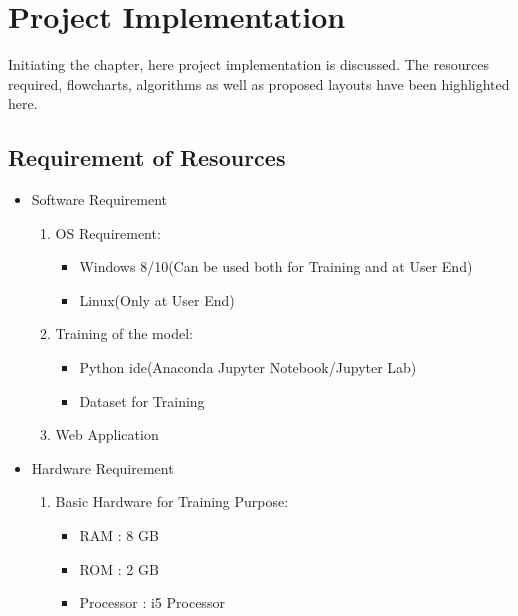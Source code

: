\chapter{Project Implementation}

Initiating the chapter, here project implementation is discussed. The resources required, flowcharts, algorithms as well as proposed layouts have been highlighted here.\\ 

\section{Requirement of Resources}
\begin{itemize}
    \item Software Requirement 
        \begin{enumerate}
            \item OS Requirement:
                \begin{itemize}
                    \item Windows 8/10(Can be used both for Training and at User End)
                    \item Linux(Only at User End)
                \end{itemize}
            \item Training of the model:
                \begin{itemize}
                    \item Python ide(Anaconda Jupyter Notebook/Jupyter Lab)
                    \item Dataset for Training
                \end{itemize} 
            \item Web Application
        \end{enumerate}
    \item Hardware Requirement
        \begin{enumerate}
            \item Basic Hardware for Training Purpose:
                \begin{itemize}
                    \item RAM : 8 GB
                    \item ROM : 2 GB
                    \item Processor : i5 Processor
                \end{itemize}
        \end{enumerate}
    \end{itemize}
    
